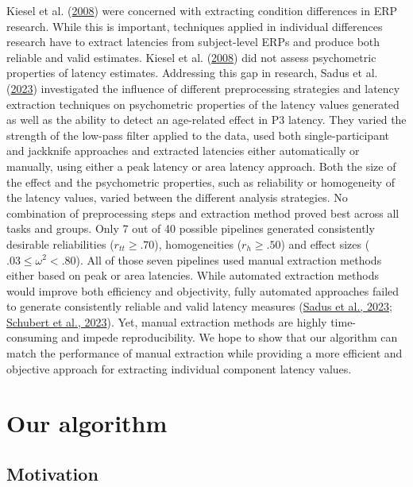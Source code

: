 \documentclass[
  man,floatsintext]{apa7}
\begin{document}
Kiesel et al. (\protect\hyperlink{ref-kiesel2008measurement}{2008}) were concerned with extracting condition differences in ERP research. While this is important, techniques applied in individual differences research have to extract latencies from subject-level ERPs and produce both reliable and valid estimates. Kiesel et al. (\protect\hyperlink{ref-kiesel2008measurement}{2008}) did not assess psychometric properties of latency estimates. Addressing this gap in research, Sadus et al. (\protect\hyperlink{ref-sadus2023multiverse}{2023}) investigated the influence of different preprocessing strategies and latency extraction techniques on psychometric properties of the latency values generated as well as the ability to detect an age-related effect in P3 latency. They varied the strength of the low-pass filter applied to the data, used both single-participant and jackknife approaches and extracted latencies either automatically or manually, using either a peak latency or area latency approach. Both the size of the effect and the psychometric properties, such as reliability or homogeneity of the latency values, varied between the different analysis strategies. No combination of preprocessing steps and extraction method proved best across all tasks and groups. Only 7 out of 40 possible pipelines generated consistently desirable reliabilities (\(r_{tt} \ge .70\)), homogeneities (\(r_{h} \ge .50\)) and effect sizes (\(.03 \le \omega^2 <.80\)). All of those seven pipelines used manual extraction methods either based on peak or area latencies. While automated extraction methods would improve both efficiency and objectivity, fully automated approaches failed to generate consistently reliable and valid latency measures (\protect\hyperlink{ref-sadus2023multiverse}{Sadus et al., 2023}; \protect\hyperlink{ref-schubert2023robust}{Schubert et al., 2023}). Yet, manual extraction methods are highly time-consuming and impede reproducibility. We hope to show that our algorithm can match the performance of manual extraction while providing a more efficient and objective approach for extracting individual component latency values.

\hypertarget{our-algorithm}{%
\section{Our algorithm}\label{our-algorithm}}

\hypertarget{motivation}{%
\subsection{Motivation}\label{motivation}}
\end{document}

